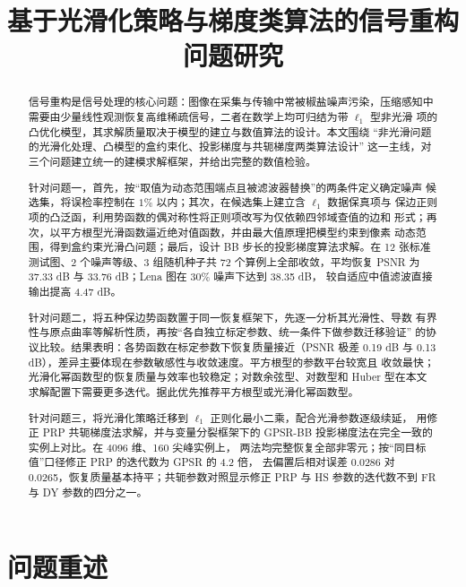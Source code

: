 \documentclass[withoutpreface,bwprint]{cumcmthesis}
\title{基于光滑化策略与梯度类算法的信号重构问题研究}
\begin{document}
\maketitle

\begin{abstract}
信号重构是信号处理的核心问题：图像在采集与传输中常被椒盐噪声污染，压缩感知中
需要由少量线性观测恢复高维稀疏信号，二者在数学上均可归结为带 $\ell_1$ 型非光滑
项的凸优化模型，其求解质量取决于模型的建立与数值算法的设计。本文围绕
``非光滑问题的光滑化处理、凸模型的盒约束化、投影梯度与共轭梯度两类算法设计''
这一主线，对三个问题建立统一的建模求解框架，并给出完整的数值检验。

针对问题一，首先，按``取值为动态范围端点且被滤波器替换''的两条件定义确定噪声
候选集，将误检率控制在 $1\%$ 以内；其次，在候选集上建立含 $\ell_1$ 数据保真项与
保边正则项的凸泛函，利用势函数的偶对称性将正则项改写为仅依赖四邻域查值的边和
形式；再次，以平方根型光滑函数逼近绝对值函数，并由最大值原理把模型约束到像素
动态范围，得到盒约束光滑凸问题；最后，设计 BB 步长的投影梯度算法求解。在
12 张标准测试图、2 个噪声等级、3 组随机种子共 72 个算例上全部收敛，平均恢复
PSNR 为 37.33 dB 与 33.76 dB；Lena 图在 30\% 噪声下达到 38.35 dB，
较自适应中值滤波直接输出提高 4.47 dB。

针对问题二，将五种保边势函数置于同一恢复框架下，先逐一分析其光滑性、导数
有界性与原点曲率等解析性质，再按``各自独立标定参数、统一条件下做参数迁移验证''
的协议比较。结果表明：各势函数在标定参数下恢复质量接近（PSNR 极差 0.19 dB 与
0.13 dB），差异主要体现在参数敏感性与收敛速度。平方根型的参数平台较宽且
收敛最快；光滑化幂函数型的恢复质量与效率也较稳定；对数余弦型、对数型和
Huber 型在本文求解配置下需要更多迭代。据此优先推荐平方根型或光滑化幂函数型。

针对问题三，将光滑化策略迁移到 $\ell_1$ 正则化最小二乘，配合光滑参数逐级续延，
用修正 PRP 共轭梯度法求解，并与变量分裂框架下的
GPSR-BB 投影梯度法在完全一致的实例上对比。在 4096 维、160 尖峰实例上，
两法均完整恢复全部非零元；按``同目标值''口径修正 PRP 的迭代数为 GPSR 的 4.2 倍，
去偏置后相对误差 0.0286 对 0.0265，恢复质量基本持平；共轭参数对照显示修正 PRP
与 HS 参数的迭代数不到 FR 与 DY 参数的四分之一。

\end{abstract}


\section{问题重述}
\end{document}

